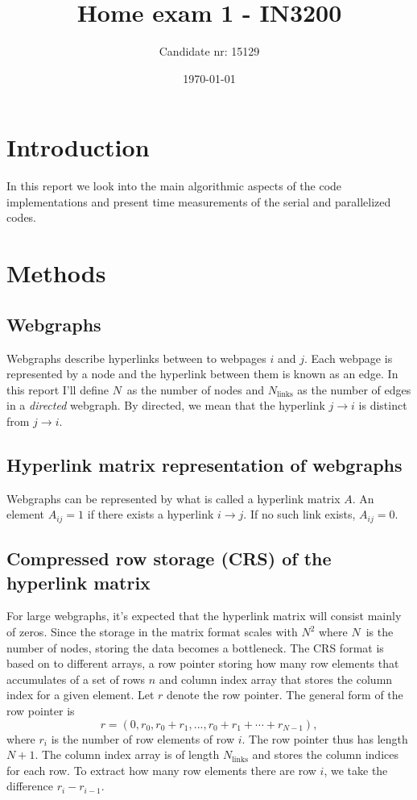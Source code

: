 \documentclass[english,notitlepage, reprint]{revtex4-1}  %
\begin{document}
\title{Home exam 1 - IN3200}      %
\author{Candidate nr: 15129}          %
\date{\today}                             %
\noaffiliation                            %
                               
\maketitle 
\section{Introduction}
In this report we look into the main algorithmic aspects of the code implementations and present time measurements of the serial and parallelized codes.
\section{Methods}

\subsection*{Webgraphs}
Webgraphs describe hyperlinks between to webpages $i$ and $j$. Each webpage is represented by a node and the hyperlink between them is known as an edge. In this report I'll define $N$ as the number of nodes and $N_\text{links}$ as the number of edges in a \textit{directed }webgraph. By directed, we mean that the hyperlink $j\to i$ is distinct from $j\to i$.

\subsection*{Hyperlink matrix representation of webgraphs}
Webgraphs can be represented by what is called a hyperlink matrix $A$. An element $A_{ij} = 1$ if there exists a hyperlink $i \to j$. If no such link exists, $A_{ij} = 0$.

\subsection*{Compressed row storage (CRS) of the hyperlink matrix}
For large webgraphs, it's expected that the hyperlink matrix will consist mainly of zeros. Since the storage in the matrix format scales with $N^2$ where $N$ is the number of nodes, storing the data becomes a bottleneck. The CRS format is based on to different arrays, a row pointer storing how many row elements that accumulates of a set of rows $n$ and column index array that stores the column index for a given element. Let $r$ denote the row pointer. The general form of the row pointer is 
\begin{equation}\label{eq:row_pointer}
	r = (0, r_0, r_0 + r_1,..., r_0 + r_1 + \cdots + r_{N-1}),
\end{equation} 
where $r_i$ is the number of row elements of row $i$. The row pointer thus has length $N+1$. The column index array is of length $N_\text{links}$ and stores the column indices for each row. To extract how many row elements there are row $i$, we take the difference $r_{i}-r_{i-1}$.
\end{document}
